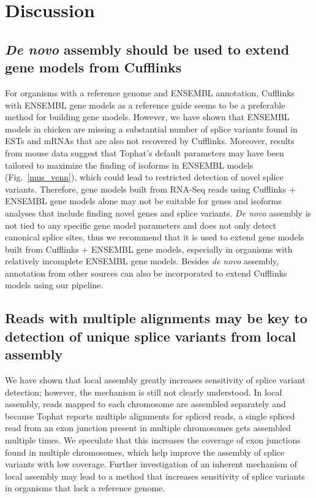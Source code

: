 \documentclass[10pt]{article}
\begin{document}
\section*{Discussion}

\subsection*{{\em De novo} assembly should be used to extend gene models from
Cufflinks}
For organisms with a reference genome and ENSEMBL annotation, Cufflinks with
ENSEMBL gene models as a reference guide seems to be a preferable method for
building gene models. However, we have shown that ENSEMBL models in chicken are
missing a substantial number of splice variants found in ESTs and mRNAs that
are also not recovered by Cufflinks. Moreover, results from mouse data suggest
that Tophat's default parameters may have been tailored to maximize the finding
of isoforms in ENSEMBL models (Fig.~\ref{mus_venn}), which could lead to
restricted detection of novel splice variants.
Therefore, gene models built from RNA-Seq reads using Cufflinks + ENSEMBL gene
models alone may not be suitable for genes and isoforms analyses that include
finding novel genes and splice variants.  {\em De novo} assembly is not tied to
any specific gene model parameters and does not only detect canonical splice
sites, thus we recommend that it is used to extend gene models built from
Cufflinks + ENSEMBL gene models, especially in organisms with relatively
incomplete ENSEMBL gene models.  Besides {\em de novo} assembly,
annotation from other sources can also be incorporated to extend Cufflinks models
using our pipeline.


\subsection*{Reads with multiple alignments may be key to detection of unique
splice variants from local assembly}
We have shown that local assembly greatly increases sensitivity of splice
variant detection; however, the mechanism is still not clearly understood.  In
local assembly, reads mapped to each chromosome are assembled separately and
because Tophat reports multiple alignments for spliced reads, a single spliced
read from an exon junction present in multiple chromosomes gets assembled
multiple times. We speculate that this increases the coverage of exon junctions
found in multiple chromosomes, which help improve the assembly of splice
variants with low coverage. Further investigation of an inherent mechanism of
local assembly may lead to a method that increases sensitivity of splice
variants in organisms that lack a reference genome.
\end{document}
